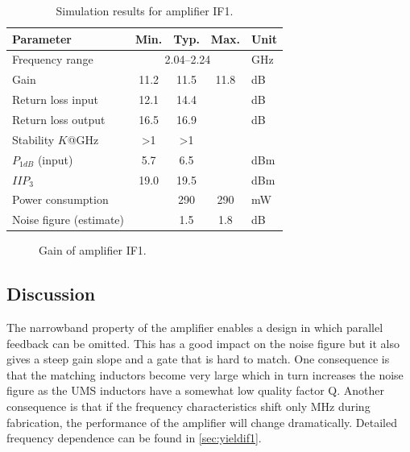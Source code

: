 			\begin{table}[hbt!]
				\caption[Simulation results for amplifier IF1.]{Simulation results for amplifier IF1.\disclaimer}
				\label{tab:resultif1}
				\centering
				\begin{tabular}{ l c c c l } \toprule
					Parameter & Min. & Typ. & Max. & Unit \\\midrule
					Frequency range & \multicolumn{3}{c}{2.04--2.24} & GHz \\
					Gain & 11.2 & 11.5 & 11.8 & dB \\
					Return loss input & 12.1 & 14.4 &  & dB \\
					Return loss output & 16.5 & 16.9 &  & dB \\
					Stability $K$@\unit[0--80]{GHz} & >1 & >1 &  &  \\
					$P_{1dB}$ (input) & 5.7 & 6.5 &  & dBm \\
					$IIP_3$ & 19.0 & 19.5 &  & dBm \\
					Power consumption &  & 290 & 290 & mW \\
					Noise figure (estimate) &  & 1.5 & 1.8 & dB \\\bottomrule
				\end{tabular}
			\end{table}

			\begin{figure}[hbt!]
				\centering
				\caption[Amplifier IF1 gain.]{Gain of amplifier IF1.}\label{fig:if1gain}
			\end{figure}


		\subsection{Discussion}
			The narrowband property of the amplifier enables a design in which parallel feedback can be omitted. This has a good impact on the noise figure but it also gives a steep gain slope and a gate that is hard to match. One consequence is that the matching inductors become very large which in turn increases the noise figure as the UMS inductors have a somewhat low quality factor Q. Another consequence is that if the frequency characteristics shift only \unit[100]{MHz} during fabrication, the performance of the amplifier will change dramatically. Detailed frequency dependence can be found in \autoref{sec:yieldif1}.

